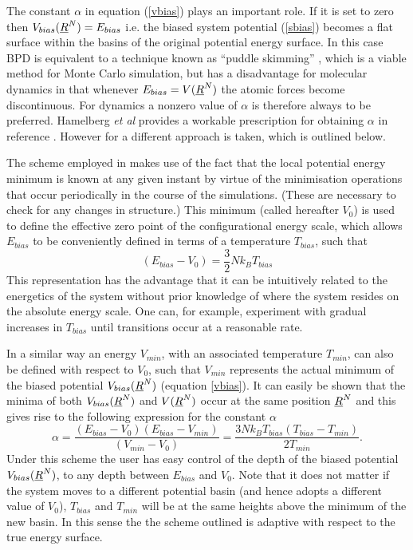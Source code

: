 The constant $\alpha$ in equation (\ref{vbias}) plays an important role. If it
is set to zero then $V_{bias}(\mbox{$\underline{R}$}^{N})=E_{bias}$ i.e. the biased system
potential (\ref{sbias}) becomes a flat surface within the basins of the
original potential energy surface. In this case BPD is equivalent to a
technique known as ``puddle skimming'' \cite{rahman-02a}, which is a viable
method for Monte Carlo simulation, but has a disadvantage for molecular
dynamics in that whenever $E_{bias}=V(\mbox{$\underline{R}$}^{N})$ the atomic forces become
discontinuous. For dynamics a nonzero value of $\alpha$ is therefore always to
be preferred. Hamelberg {\em et al} provides a workable prescription for
obtaining $\alpha$ in reference \cite{hamelberg-04a}. However for \D{} a
different approach is taken, which is outlined below.

The scheme employed in \D{} makes use of the fact that the local potential
energy minimum is known at any given instant by virtue of the minimisation
operations that occur periodically in the course of the simulations. (These
are necessary to check for any changes in structure.) This minimum (called
hereafter $V_{0}$) is used to define the effective zero point of the
configurational energy scale, which allows $E_{bias}$ to be conveniently
defined in terms of a temperature $T_{bias}$, such that
\begin{equation}
(E_{bias}-V_{0})=\frac{3}{2}Nk_{B}T_{bias}
\end{equation}
This representation has the advantage that it can be intuitively related to
the energetics of the system without prior knowledge of where the system
resides on the absolute energy scale. One can, for example, experiment with
gradual increases in $T_{bias}$ until transitions occur at a reasonable rate.

In a similar way an energy $V_{min}$, with an associated temperature
$T_{min}$, can also be defined with respect to $V_{0}$, such that $V_{min}$
represents the actual minimum of the biased potential $V_{bias}(\mbox{$\underline{R}$}^{N})$
(equation \ref{vbias}). It can easily be shown that the minima of both
$V_{bias}(\mbox{$\underline{R}$}^{N})$ and $V(\mbox{$\underline{R}$}^{N})$ occur at the same position
$\mbox{$\underline{R}$}^{N}$ and this gives rise to the following expression for the
constant $\alpha$
\begin{equation}
\alpha=\frac{(E_{bias}-V_{0})(E_{bias}-V_{min})}{(V_{min}-V_{0})}
=\frac{3Nk_{B}T_{bias}(T_{bias}-T_{min})}{2T_{min}}.
\end{equation}
Under this scheme the user has easy control of the depth of the biased
potential $V_{bias}(\mbox{$\underline{R}$}^{N})$, to any depth between $E_{bias}$ and
$V_{0}$. Note that it does not matter if the system moves to a different
potential basin (and hence adopts a different value of $V_{0}$), $T_{bias}$ and
$T_{min}$ will be at the same heights above the minimum of the new basin.
In this sense the the scheme outlined is adaptive with respect to the true
energy surface.

